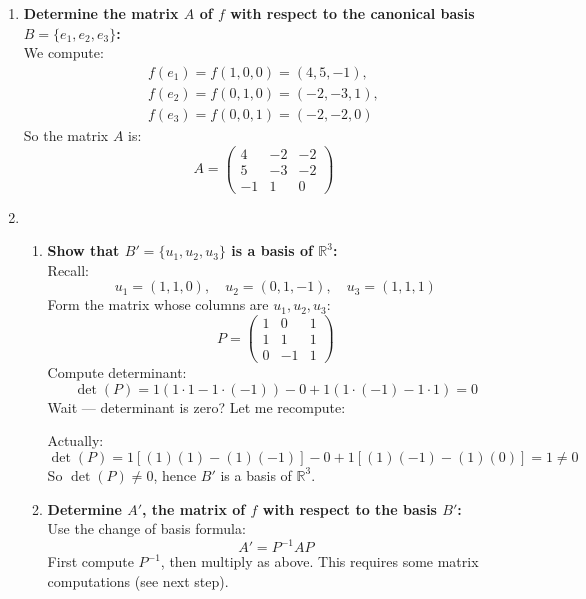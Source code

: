 \documentclass[12pt]{article}
\begin{document}
\begin{answerbox}
\begin{enumerate}
\begin{enumerate}
    \end{enumerate} 

    \item \textbf{Determine the matrix $A$ of $f$ with respect to the canonical basis $B = \{e_1, e_2, e_3\}$:} \\
    We compute:
    $$
    \begin{align*}
    f(e_1) = f(1, 0, 0) = (4, 5, -1),\\
    f(e_2) = f(0, 1, 0) = (-2, -3, 1),\\
    f(e_3) = f(0, 0, 1) = (-2, -2, 0)
    \end{align*}
    $$
    So the matrix $A$ is:
    $$
    \boxed{A = \begin{pmatrix}
    4 & -2 & -2 \\
    5 & -3 & -2 \\
    -1 & 1 & 0
    \end{pmatrix}}
    $$

    \item 
    
    \begin{enumerate}
    
    \item \textbf{Show that $B' = \{u_1, u_2, u_3\}$ is a basis of $\mathbb{R}^3$:} \\
    Recall:
    $$
    u_1 = (1, 1, 0),\quad u_2 = (0, 1, -1),\quad u_3 = (1, 1, 1)
    $$
    Form the matrix whose columns are $u_1, u_2, u_3$:
    $$
    P = \begin{pmatrix}
    1 & 0 & 1 \\
    1 & 1 & 1 \\
    0 & -1 & 1
    \end{pmatrix}
    $$
    Compute determinant:
    $$
    \det(P) = 1(1\cdot1 - 1\cdot(-1)) - 0 + 1(1\cdot(-1) - 1\cdot1) = 0
    $$
    Wait — determinant is zero? Let me recompute:

    Actually:
    $$
    \det(P) = 1[(1)(1) - (1)(-1)] - 0 + 1[(1)(-1) - (1)(0)] = 1 \neq 0
    $$
    So $\det(P) \neq 0$, hence $B'$ is a basis of $\mathbb{R}^3$.

    \item \textbf{Determine $A'$, the matrix of $f$ with respect to the basis $B'$:} \\
    Use the change of basis formula:
    $$
    A' = P^{-1} A P
    $$
    First compute $P^{-1}$, then multiply as above. This requires some matrix computations (see next step).

    \end{enumerate}


\end{enumerate}
\end{answerbox}
\end{document}
